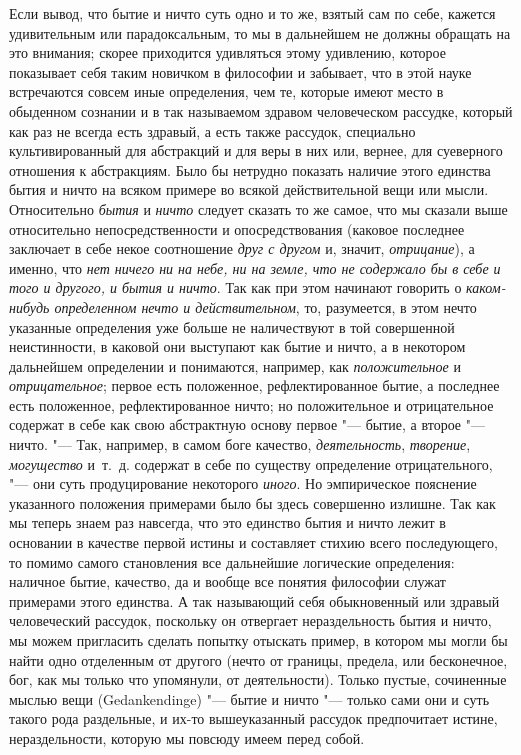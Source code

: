 Если вывод, что бытие и ничто суть одно и то же, взятый сам по себе, кажется
удивительным или парадоксальным, то мы в дальнейшем не должны обращать на
это внимания; скорее приходится удивляться этому удивлению, которое
показывает себя таким новичком в философии и забывает, что в этой науке
встречаются совсем иные определения, чем те, которые имеют место в
обыденном сознании и в так называемом здравом человеческом рассудке,
который как раз не всегда есть здравый, а есть также рассудок, специально
культивированный для абстракций и для веры в них или, вернее, для
суеверного отношения к абстракциям. Было бы нетрудно показать наличие этого
единства бытия и ничто на всяком примере во всякой действительной вещи или
мысли. Относительно {\em бытия} и
{\em ничто} следует сказать то же самое, что мы сказали
выше относительно непосредственности и опосредствования (каковое последнее
заключает в себе некое соотношение {\em друг с другом}
и, значит, {\em отрицание}), а именно, что
{\em нет ничего ни на небе, ни на земле, что не
содержало бы в себе и того и другого, и бытия и ничто}. Так как при этом
начинают говорить о {\em каком-нибудь определенном
нечто и действительном}, то, разумеется, в этом нечто указанные определения
уже больше не наличествуют в той совершенной неистинности, в каковой они
выступают как бытие и ничто, а в некотором дальнейшем определении и
понимаются, например, как {\em положительное} и
{\em отрицательное}; первое есть положенное,
рефлектированное бытие, а последнее есть положенное, рефлектированное
ничто; но положительное и отрицательное содержат в себе как свою
абстрактную основу первое "--- бытие, а второе "--- ничто. "--- Так, например, в
самом боге качество, {\em деятельность}, {\em творение}, {\em могущество}
и~т.~д. содержат в себе по существу определение отрицательного, "--- они суть
продуцирование некоторого {\em иного}. Но
эмпирическое пояснение указанного положения примерами было бы здесь
совершенно излишне. Так как мы теперь знаем раз навсегда, что это единство
бытия и ничто лежит в основании в качестве первой истины и составляет
стихию всего последующего, то помимо самого становления все дальнейшие
логические определения: наличное бытие, качество, да и вообще все понятия
философии служат примерами этого единства. А так называющий себя
обыкновенный или здравый человеческий рассудок, поскольку он отвергает
нераздельность бытия и ничто, мы можем пригласить сделать попытку отыскать
пример, в котором мы могли бы найти одно отделенным от другого (нечто от
границы, предела, или бесконечное, бог, как мы только что упомянули, от
деятельности). Только пустые, сочиненные мыслью вещи (Gedankendinge)
"--- бытие и ничто "--- только сами они и суть такого рода раздельные, и их-то
вышеуказанный рассудок предпочитает истине, нераздельности, которую мы
повсюду имеем перед собой.


